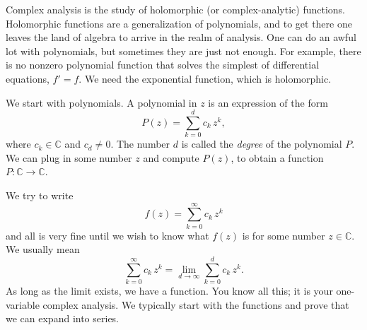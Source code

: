 \documentclass[12pt,openany]{book}
\newcommand{\C}{{\mathbb{C}}}
\theoremstyle{plain}
\theoremstyle{remark}
\theoremstyle{definition}
\theoremstyle{exercise}
\theoremstyle{example}
\begin{document}
\medskip

Complex analysis is the study of holomorphic (or complex-analytic)
functions.
Holomorphic functions are a generalization of polynomials,
and to get there one leaves the land of algebra to arrive in the realm of
analysis.
One can do an awful lot with polynomials, but sometimes they are
just not enough.  For example, there is no nonzero polynomial function that solves
the simplest of differential equations, $f' = f$.  We need the exponential
function, which is holomorphic.

We start with polynomials.  A polynomial in $z$ is
an expression of the form
\begin{equation*}
P(z) = \sum_{k=0}^d c_k \, z^k ,
\end{equation*}
where $c_k \in \C$ and $c_d \not= 0$.  The number $d$ is called the
\emph{degree}
of the
polynomial $P$.  We can plug in some number $z$ and compute
$P(z)$, to obtain a function $P \colon \C \to \C$.

We try to write
\begin{equation*}
f(z) = \sum_{k=0}^\infty c_k \, z^k
\end{equation*}
and all is very fine until we wish to know what $f(z)$ is for some number
$z \in \C$.
We usually mean
\begin{equation*}
\sum_{k=0}^\infty c_k \, z^k
=
\lim_{d\to\infty}
\sum_{k=0}^d c_k \, z^k .
\end{equation*}
As long as the limit exists, we have a function.  You know all
this; it is your one-variable complex analysis.  We typically
start with the functions and prove that we can expand into series.
\end{document}
